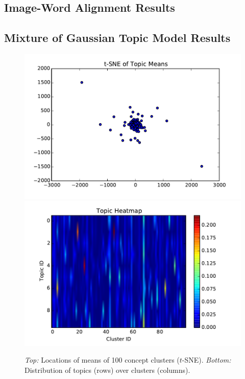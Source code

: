 \documentclass[11pt]{article}
\begin{document}
\subsection{Image-Word Alignment Results}

\subsection{Mixture of Gaussian Topic Model Results}

\begin{figure}
\centering
\includegraphics[width=\columnwidth]{assets/gtm100_mu_tsne.pdf}
\includegraphics[width=\columnwidth]{assets/gtm100_topic_heatmap.pdf}
\caption{\emph{Top:} Locations of means of 100 concept clusters ($t$-SNE). \emph{Bottom:} Distribution of topics (rows) over clusters (columns).}
\end{figure}
\end{document}

